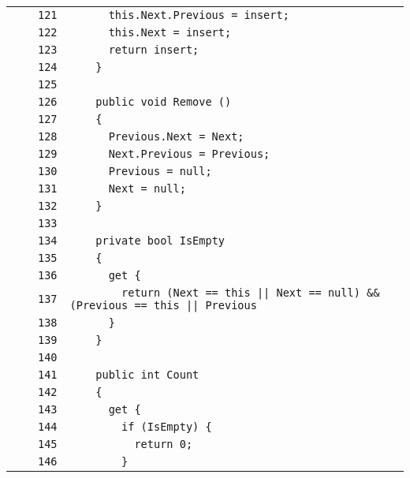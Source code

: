 \documentclass[a4paper,10pt]{article}
\begin{document}
\begin{longtable}[l]{lrrl}
\cellcolor{gray} &  & \verb~121~ & \verb~      this.Next.Previous = insert;~\\
\cellcolor{gray} &  & \verb~122~ & \verb~      this.Next = insert;~\\
\cellcolor{gray} &  & \verb~123~ & \verb~      return insert;~\\
\cellcolor{gray} &  & \verb~124~ & \verb~    }~\\
\cellcolor{gray} &  & \verb~125~ & \verb~~\\
\cellcolor{gray} &  & \verb~126~ & \verb~    public void Remove ()~\\
\cellcolor{gray} &  & \verb~127~ & \verb~    {~\\
\cellcolor{gray} &  & \verb~128~ & \verb~      Previous.Next = Next;~\\
\cellcolor{gray} &  & \verb~129~ & \verb~      Next.Previous = Previous;~\\
\cellcolor{gray} &  & \verb~130~ & \verb~      Previous = null;~\\
\cellcolor{gray} &  & \verb~131~ & \verb~      Next = null;~\\
\cellcolor{gray} &  & \verb~132~ & \verb~    }~\\
\cellcolor{gray} &  & \verb~133~ & \verb~~\\
\cellcolor{gray} &  & \verb~134~ & \verb~    private bool IsEmpty~\\
\cellcolor{gray} &  & \verb~135~ & \verb~    {~\\
\cellcolor{gray} &  & \verb~136~ & \verb~      get {~\\
\cellcolor{gray} &  & \verb~137~ & \verb~        return (Next == this || Next == null) && (Previous == this || Previous~\\
\cellcolor{gray} &  & \verb~138~ & \verb~      }~\\
\cellcolor{gray} &  & \verb~139~ & \verb~    }~\\
\cellcolor{gray} &  & \verb~140~ & \verb~~\\
\cellcolor{gray} &  & \verb~141~ & \verb~    public int Count~\\
\cellcolor{gray} &  & \verb~142~ & \verb~    {~\\
\cellcolor{gray} &  & \verb~143~ & \verb~      get {~\\
\cellcolor{gray} &  & \verb~144~ & \verb~        if (IsEmpty) {~\\
\cellcolor{gray} &  & \verb~145~ & \verb~          return 0;~\\
\cellcolor{gray} &  & \verb~146~ & \verb~        }~\\

\end{longtable}
\end{document}
